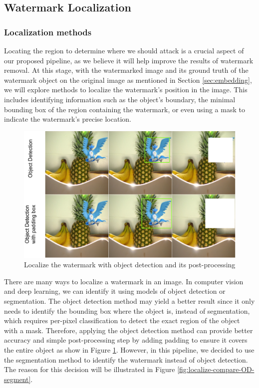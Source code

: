 \label{sec:removal}
\subsection{Watermark Localization}
\subsubsection{Localization methods}
Locating the region to determine where we should attack is a crucial aspect of our proposed pipeline, as we believe it will help improve the results of watermark removal. At this stage, with the watermarked image and its ground truth of the watermark object on the original image as mentioned in Section \ref{sec:embedding}, we will explore methods to localize the watermark's position in the image. This includes identifying information such as the object's boundary, the minimal bounding box of the region containing the watermark, or even using a mask to indicate the watermark's precise location.

\begin{figure}[t]
    \centering
    \includegraphics[width=0.8\linewidth]{img/od_w_postprocess.png}
    \caption{Localize the watermark with object detection and its post-processing}
    \label{fig:od_w_postprocess}
\end{figure}

There are many ways to localize a watermark in an image. In computer vision and deep learning, we can identify it using models of object detection or segmentation. The object detection method may yield a better result since it only needs to identify the bounding box where the object is, instead of segmentation, which requires per-pixel classification to detect the exact region of the object with a mask. Therefore, applying the object detection method can provide better accuracy and simple post-processing step by adding padding to ensure it covers the entire object as show in Figure \ref{fig:od_w_postprocess}. However, in this pipeline, we decided to use the segmentation method to identify the watermark instead of object detection. The reason for this decision will be illustrated in Figure  \ref{fig:localize-compare-OD-segment}.

